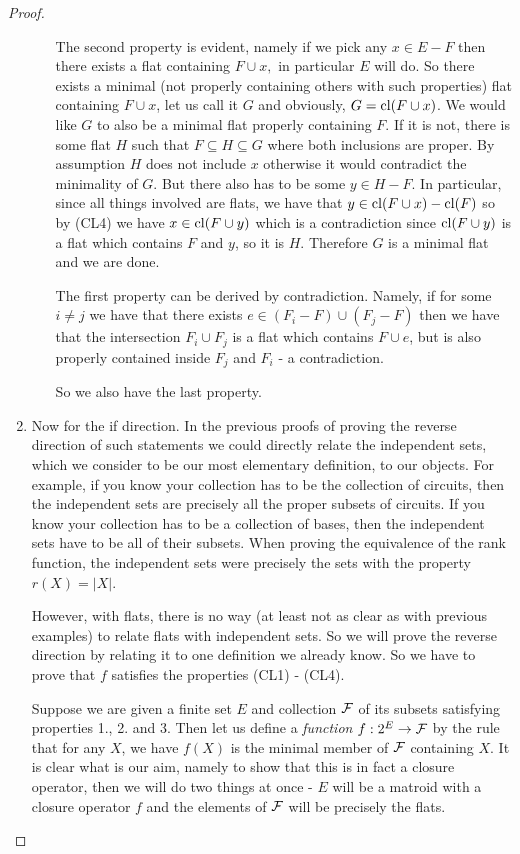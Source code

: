 \begin{proof}
\begin{enumerate}
\begin{enumerate}
    The second property is evident, namely if we pick any $x \in E - F$ then there exists a flat containing $F \cup x, $ in particular $E$ will do. So there exists a minimal (not properly containing others with such properties) flat containing $F \cup x$, let us call it $G$ and obviously, $G = \mathrm{cl}(F \cup x)$. We would like $G$ to also be a minimal flat properly containing $F$. If it is not, there is some flat $H$ such that $F \subseteq H \subseteq G$ where both inclusions are proper. By assumption $H$ does not include $x$ otherwise it would contradict the minimality of $G.$ But there also has to be some $y \in H - F$. In particular, since all things involved are flats, we have that $y \in \mathrm{cl}(F \cup x) - \mathrm{cl}(F)$ so by (CL4) we have $x \in \mathrm{cl}(F \cup y)$ which is a contradiction since $\mathrm{cl}(F \cup y)$ is a flat which contains $F$ and $y$, so it is $H.$  Therefore $G$ is a minimal flat and we are done.

    The first property can be derived by contradiction. Namely, if for some $i\neq j$ we have that there exists $e \in (F_i - F)\cup(F_j - F)$ then we have that the intersection $F_i \cup F_j$ is a flat which contains $F\cup e$, but is also properly contained inside $F_j$ and $F_i$ - a contradiction.

    So we also have the last property.
    
\end{enumerate}

\item[\impliedby]
    Now for the if direction. In the previous proofs of proving the reverse direction of such statements we could directly relate the independent sets, which we consider to be our most elementary definition, to our objects. For example, if you know your collection has to be the collection of circuits, then the independent sets are precisely all the proper subsets of circuits. If you know your collection has to be a collection of bases, then the independent sets have to be all of their subsets. When proving the equivalence of the rank function, the independent sets were precisely the sets with the property $r(X) = |X|$. 

    However, with flats, there is no way (at least not as clear as with previous examples) to relate flats with independent sets. So we will prove the reverse direction by relating it to one definition we already know. So we have to prove that $f$ satisfies the properties (CL1) - (CL4).

    Suppose we are given a finite set $E$ and collection $\mathcal{F}$ of its subsets satisfying properties 1., 2. and 3. Then let us define a \textit{function} $f: 2^E \to \mathcal{F}$ by the rule that for any $X$, we have $f(X)$ is the minimal member of $\mathcal{F}$ containing $X$. It is clear what is our aim, namely to show that this is in fact a closure operator, then we will do two things at once - $E$ will be a matroid with a closure operator $f$ and the elements of $\mathcal{F}$ will be precisely the flats.


\end{enumerate}
\end{proof}
